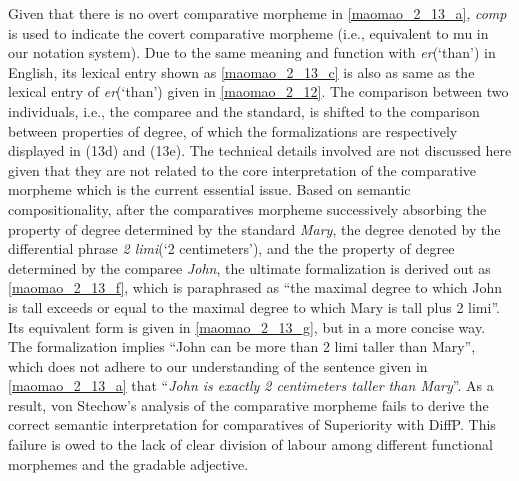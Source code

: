 \documentclass{ctexart}
\begin{document}
Given that there is no overt comparative morpheme in \ref{maomao_2_13_a}, \textit{comp} is used to indicate the covert comparative morpheme (i.e., equivalent to mu in our notation system). Due to the same meaning and function with \textit{er}(`than') in English, its lexical entry shown as \ref{maomao_2_13_c} is also as same as the lexical entry of \textit{er}(`than') given in \ref{maomao_2_12}. The comparison between two individuals, i.e., the comparee and the standard, is shifted to the comparison between properties of degree, of which the formalizations are respectively displayed in (13d) and (13e). The technical details involved are not discussed here given that they are not related to the core interpretation of the comparative morpheme which is the current essential issue. Based on semantic compositionality, after the comparatives morpheme successively absorbing the property of degree determined by the standard \textit{Mary}, the degree denoted by the differential phrase \textit{2 limi}(`2 centimeters'), and the the property of degree determined by the comparee \textit{John}, the ultimate formalization is derived out as \ref{maomao_2_13_f}, which is paraphrased as ``the maximal degree to which John is tall exceeds or equal to the maximal degree to which Mary is tall plus 2 limi''. Its equivalent form is given in \ref{maomao_2_13_g}, but in a more concise way. The formalization implies ``John can be more than 2 limi taller than Mary'', which does not adhere to our understanding of the sentence given in \ref{maomao_2_13_a} that ``\textit{John is exactly 2 centimeters taller than Mary}''. As a result, von Stechow's analysis of the comparative morpheme fails to derive the correct semantic interpretation for comparatives of Superiority with DiffP. This failure is owed to the lack of clear division of labour among different functional morphemes and the gradable adjective.
\end{document}

